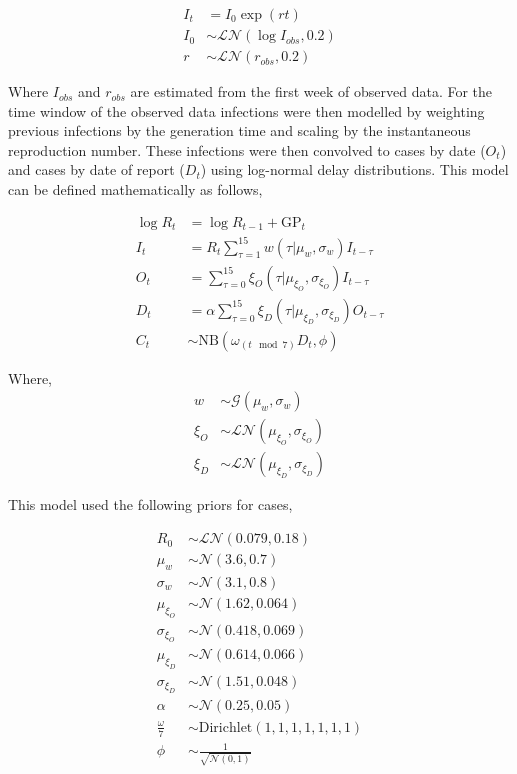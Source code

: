 \begin{align}
  I_{t} &= I_0 \exp  \left(r t \right)  \\
  I_0 &\sim \mathcal{LN}(\log I_{obs}, 0.2) \\
  r &\sim \mathcal{LN}(r_{obs}, 0.2) 
\end{align}

Where \(I_{obs}\) and \(r_{obs}\) are estimated from the first week of observed data. For the time window of the observed data infections were then modelled by weighting previous infections by the generation time and scaling by the instantaneous reproduction number. These infections were then convolved to cases by date (\(O_t\)) and cases by date of report (\(D_t\)) using log-normal delay distributions. This model can be defined mathematically as follows,

\begin{align}
  \log R_{t} &= \log R_{t-1} + \mathrm{GP}_t \\
  I_t &= R_t \sum_{\tau = 1}^{15} w(\tau | \mu_{w}, \sigma_{w}) I_{t - \tau} \\
  O_t &= \sum_{\tau = 0}^{15} \xi_{O}(\tau | \mu_{\xi_{O}}, \sigma_{\xi_{O}}) I_{t-\tau} \\
  D_t &= \alpha \sum_{\tau = 0}^{15} \xi_{D}(\tau | \mu_{\xi_{D}}, \sigma_{\xi_{D}}) O_{t-\tau} \\ 
  C_t &\sim \mathrm{NB}\left(\omega_{(t \mod 7)}D_t, \phi\right)
\end{align}

Where,
\begin{align}
     w &\sim \mathcal{G}(\mu_{w}, \sigma_{w}) \\
    \xi_{O} &\sim \mathcal{LN}(\mu_{\xi_{O}}, \sigma_{\xi_{O}}) \\
    \xi_{D} &\sim \mathcal{LN}(\mu_{\xi_{D}}, \sigma_{\xi_{D}}) 
\end{align}

This model used the following priors for cases,

\begin{align}
     R_0 &\sim \mathcal{LN}(0.079, 0.18) \\
    \mu_w &\sim \mathcal{N}(3.6, 0.7) \\
    \sigma_w &\sim \mathcal{N}(3.1, 0.8) \\
    \mu_{\xi_{O}} &\sim \mathcal{N}(1.62, 0.064) \\
    \sigma_{\xi_{O}} &\sim \mathcal{N}(0.418, 0.069) \\
    \mu_{\xi_{D}} &\sim \mathcal{N}(0.614, 0.066) \\
    \sigma_{\xi_{D}} &\sim \mathcal{N}(1.51, 0.048) \\
    \alpha &\sim \mathcal{N}(0.25, 0.05) \\
    \frac{\omega}{7} &\sim \mathrm{Dirichlet}(1, 1, 1, 1, 1, 1, 1) \\
    \phi &\sim \frac{1}{\sqrt{\mathcal{N}(0, 1)}}
\end{align}

